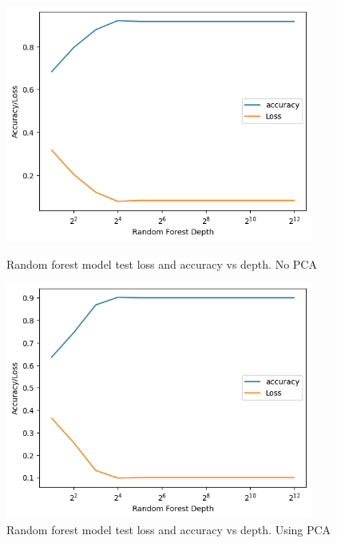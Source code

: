 \documentclass[12pt,a4paper]{article}
\begin{document}
    \begin{figure}[h]
        \centering
        \begin{minipage}{0.45\textwidth}
            \centering
            \includegraphics[width=0.9\textwidth]{random-forest-nopca} %
            \caption{Random forest model test loss and accuracy vs depth. No PCA}
            \label{fig:random-forest-nopca}
        \end{minipage}\hfill
        \begin{minipage}{0.45\textwidth}
            \centering
            \includegraphics[width=0.9\textwidth]{random-forest-pca} %
            \caption{Random forest model test loss and accuracy vs depth. Using PCA}
            \label{fig:random-forest-pca}
        \end{minipage}
    \end{figure}
\end{document}
